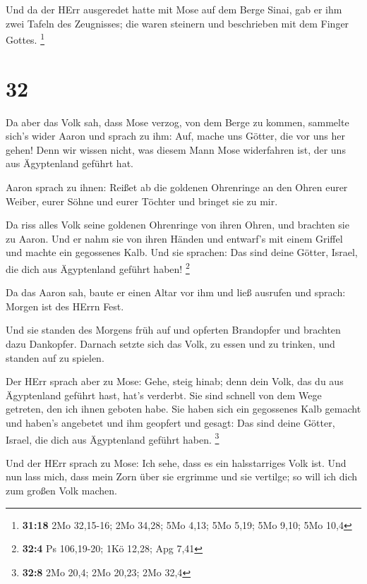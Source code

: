  Und da der HErr ausgeredet hatte mit Mose auf dem Berge
Sinai, gab er ihm zwei Tafeln des Zeugnisses; die waren steinern und
beschrieben mit dem Finger Gottes. \footnote{\textbf{31:18} 2Mo
  32,15-16; 2Mo 34,28; 5Mo 4,13; 5Mo 5,19; 5Mo 9,10; 5Mo 10,4}

\hypertarget{section-8}{%
\section{32}\label{section-8}}

 Da aber das Volk sah, dass Mose verzog, von dem Berge zu
kommen, sammelte sich's wider Aaron und sprach zu ihm: Auf, mache uns
Götter, die vor uns her gehen! Denn wir wissen nicht, was diesem Mann
Mose widerfahren ist, der uns aus Ägyptenland geführt hat.

 Aaron sprach zu ihnen: Reißet ab die goldenen Ohrenringe an
den Ohren eurer Weiber, eurer Söhne und eurer Töchter und bringet sie zu
mir.

 Da riss alles Volk seine goldenen Ohrenringe von ihren
Ohren, und brachten sie zu Aaron.  Und er nahm sie von ihren
Händen und entwarf's mit einem Griffel und machte ein gegossenes Kalb.
Und sie sprachen: Das sind deine Götter, Israel, die dich aus
Ägyptenland geführt haben! \footnote{\textbf{32:4} Ps 106,19-20; 1Kö
  12,28; Apg 7,41}

 Da das Aaron sah, baute er einen Altar vor ihm und ließ
ausrufen und sprach: Morgen ist des HErrn Fest.

 Und sie standen des Morgens früh auf und opferten
Brandopfer und brachten dazu Dankopfer. Darnach setzte sich das Volk, zu
essen und zu trinken, und standen auf zu spielen.

 Der HErr sprach aber zu Mose: Gehe, steig hinab; denn dein
Volk, das du aus Ägyptenland geführt hast, hat's verderbt. 
Sie sind schnell von dem Wege getreten, den ich ihnen geboten habe. Sie
haben sich ein gegossenes Kalb gemacht und haben's angebetet und ihm
geopfert und gesagt: Das sind deine Götter, Israel, die dich aus
Ägyptenland geführt haben. \footnote{\textbf{32:8} 2Mo 20,4; 2Mo 20,23;
  2Mo 32,4}

 Und der HErr sprach zu Mose: Ich sehe, dass es ein
halsstarriges Volk ist.  Und nun lass mich, dass mein Zorn
über sie ergrimme und sie vertilge; so will ich dich zum großen Volk
machen.

